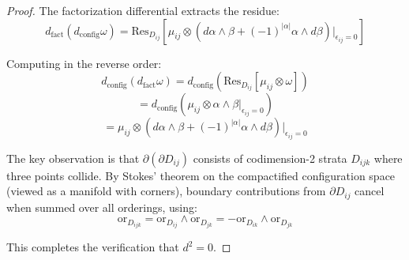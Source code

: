 \begin{proof}
The factorization differential extracts the residue:
$$d_{\text{fact}}(d_{\text{config}}\omega) = \text{Res}_{D_{ij}}[\mu_{ij} \otimes (d\alpha \wedge \beta + (-1)^{|\alpha|}\alpha \wedge d\beta)|_{\epsilon_{ij}=0}]$$

Computing in the reverse order:
$$d_{\text{config}}(d_{\text{fact}}\omega) = d_{\text{config}}(\text{Res}_{D_{ij}}[\mu_{ij} \otimes \omega])$$
$$= d_{\text{config}}(\mu_{ij} \otimes \alpha \wedge \beta|_{\epsilon_{ij}=0})$$
$$= \mu_{ij} \otimes (d\alpha \wedge \beta + (-1)^{|\alpha|}\alpha \wedge d\beta)|_{\epsilon_{ij}=0}$$

The key observation is that $\partial(\partial D_{ij})$ consists of codimension-2 strata $D_{ijk}$ where three points collide. By Stokes' theorem on the compactified configuration space (viewed as a manifold with corners), boundary contributions from $\partial D_{ij}$ cancel when summed over all orderings, using:
$$\text{or}_{D_{ijk}} = \text{or}_{D_{ij}} \wedge \text{or}_{D_{jk}} = -\text{or}_{D_{ik}} \wedge \text{or}_{D_{jk}}$$

This completes the verification that $d^2 = 0$.
\end{proof}


